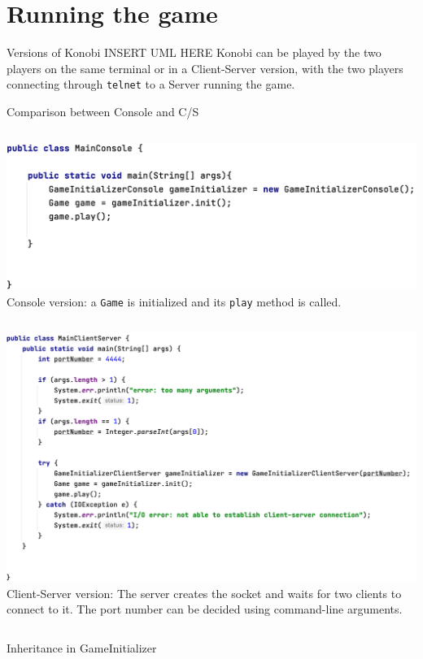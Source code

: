 \documentclass{beamer}
\begin{document}
\section{Running the game}

\begin{frame}{Versions of Konobi}
INSERT UML HERE
Konobi can be played by the two players on the same terminal or in a Client-Server version, with the two players connecting through \texttt{telnet} to a Server running the game.
\end{frame}

\begin{frame}{Comparison between Console and C/S}
\begin{columns}
\includegraphics[scale=0.27]{images/mainCo.png}
Console version: a \texttt{Game} is initialized and its \texttt{play} method is called.
\end{columns}
\vspace{0.5cm}
\begin{columns}
\includegraphics[scale=0.21]{images/mainCS.png}
Client-Server version: The server creates the socket and waits for two clients to connect to it. The port number can be decided using command-line arguments.
\end{columns}\end{frame}
\begin{frame}{Inheritance in GameInitializer}

\end{frame}









     
\end{document}

